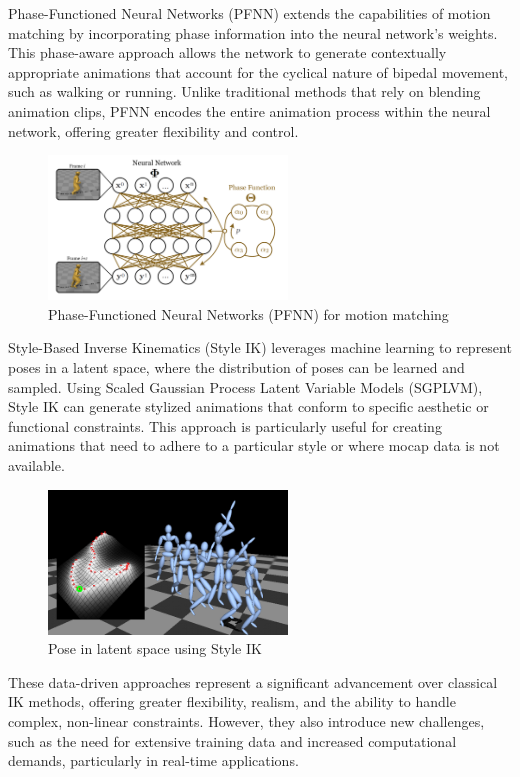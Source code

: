 \documentclass[../../main.tex]{subfiles}
\begin{document}
Phase-Functioned Neural Networks (PFNN) \cite{sheng2021pfnn} extends the capabilities of motion matching by incorporating phase information into the neural network's weights. This phase-aware approach allows the network to generate contextually appropriate animations that account for the cyclical nature of bipedal movement, such as walking or running. Unlike traditional methods that rely on blending animation clips, PFNN encodes the entire animation process within the neural network, offering greater flexibility and control.

\begin{figure}
  \centering \includegraphics[width = 2.5in]{chapters/motion_matching/images/pfnn.png}
  \caption{Phase-Functioned Neural Networks (PFNN) for motion matching}
  \label{fig:pfnn}
\end{figure}

Style-Based Inverse Kinematics (Style IK) leverages machine learning to represent poses in a latent space, where the distribution of poses can be learned and sampled. Using Scaled Gaussian Process Latent Variable Models (SGPLVM), Style IK can generate stylized animations that conform to specific aesthetic or functional constraints. This approach is particularly useful for creating animations that need to adhere to a particular style or where mocap data is not available\cite{grochow2004style}.

\begin{figure}
  \centering \includegraphics[width = 2.5in]{chapters/motion_matching/images/style_ik.png}
  \caption{Pose in latent space using Style IK}
  \label{fig:style_ik}
\end{figure}

These data-driven approaches represent a significant advancement over classical IK methods, offering greater flexibility, realism, and the ability to handle complex, non-linear constraints. However, they also introduce new challenges, such as the need for extensive training data and increased computational demands, particularly in real-time applications.
\end{document}
